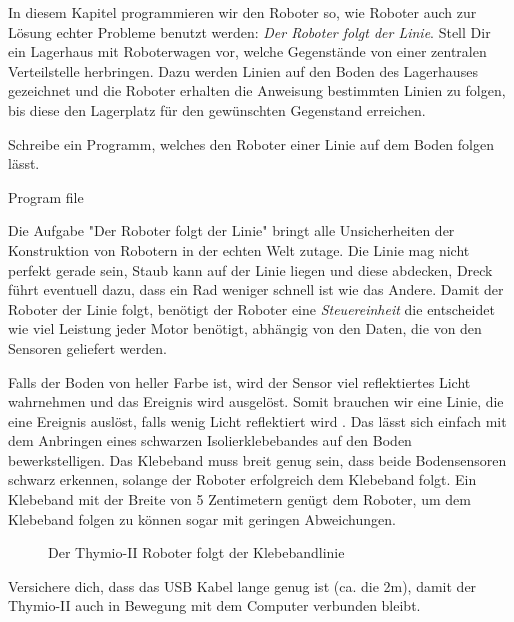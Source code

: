 \label{ch.line}

In diesem Kapitel programmieren wir den Roboter so,
wie Roboter auch zur Lösung echter Probleme benutzt werden:
\emph{Der Roboter folgt der Linie}.
Stell Dir ein Lagerhaus mit Roboterwagen vor,
welche Gegenstände von einer zentralen Verteilstelle herbringen.
Dazu werden Linien auf den Boden des Lagerhauses gezeichnet
und die Roboter erhalten die Anweisung bestimmten Linien zu folgen,
bis diese den Lagerplatz für den gewünschten Gegenstand erreichen.

Schreibe ein Programm, welches den Roboter einer Linie auf dem Boden folgen lässt.

{\raggedleft \hfill Program file }

Die Aufgabe "Der Roboter folgt der Linie" bringt
alle Unsicherheiten der Konstruktion von Robotern in der echten Welt zutage.
Die Linie mag nicht perfekt gerade sein,
Staub kann auf der Linie liegen und diese abdecken,
Dreck führt eventuell dazu, dass ein Rad weniger schnell ist wie das Andere.
Damit der Roboter der Linie folgt, benötigt der Roboter eine
\emph{Steuereinheit} die entscheidet wie viel Leistung jeder Motor benötigt,
abhängig von den Daten, die von den Sensoren geliefert werden.


Falls der Boden von heller Farbe ist,
wird der Sensor viel reflektiertes Licht wahrnehmen und das Ereignis   wird ausgelöst.
Somit brauchen wir eine Linie, die eine Ereignis auslöst, 
falls wenig Licht reflektiert wird .
Das lässt sich einfach mit dem Anbringen eines schwarzen
Isolierklebebandes auf den Boden bewerkstelligen.
Das Klebeband muss breit genug sein,
dass beide Bodensensoren schwarz erkennen,
solange der Roboter erfolgreich dem Klebeband folgt.
Ein Klebeband mit der Breite von 5 Zentimetern genügt dem Roboter,
um dem Klebeband folgen zu können sogar mit geringen Abweichungen.

\begin{figure}
\begin{center}
\caption{Der Thymio-II Roboter folgt der Klebebandlinie}
\label{fig.tape}
\end{center}
\end{figure}

Versichere dich,
dass das USB Kabel lange genug ist (ca. die 2m),
damit der Thymio-II auch in Bewegung mit dem Computer verbunden bleibt.

